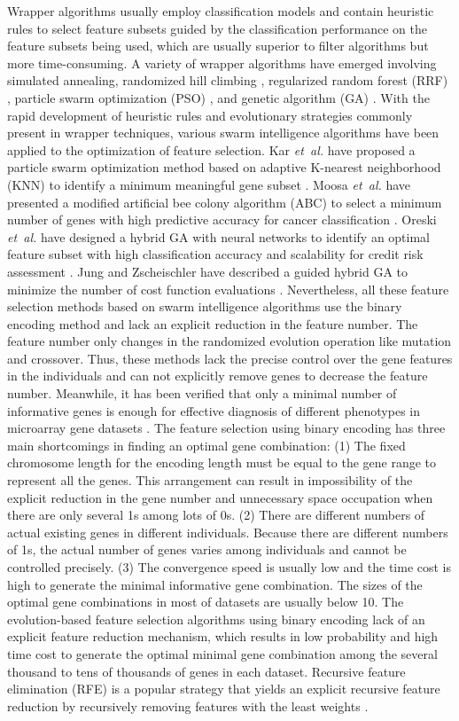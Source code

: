 \documentclass[10pt,journal,compsoc]{IEEEtran}
\begin{document}
	Wrapper algorithms usually employ classification models and contain heuristic rules to select feature subsets guided by the classification performance on the feature subsets being used, which are usually superior to filter algorithms but more time-consuming. A variety of wrapper algorithms have emerged involving simulated annealing, randomized hill climbing \cite{W26}, regularized random forest (RRF) \cite{W11}, particle swarm optimization (PSO) \cite{W12,W10}, and genetic algorithm (GA) \cite{W13}. With the rapid development of heuristic rules and evolutionary strategies commonly present in wrapper techniques, various swarm intelligence algorithms have been applied to the optimization of feature selection. Kar \emph{et~al.} have proposed a particle swarm optimization method based on adaptive K-nearest neighborhood (KNN) to identify a minimum meaningful gene subset \cite{W15}. Moosa \emph{et~al.} have presented a modified artificial bee colony algorithm (ABC) to select a minimum number of genes with high predictive accuracy for cancer classification \cite{P32}. Oreski \emph{et~al.} have designed a hybrid GA with neural networks to identify an optimal feature subset with high classification accuracy and scalability for credit risk assessment \cite{W17}. Jung and Zscheischler have described a guided hybrid GA to minimize the number of cost function evaluations \cite{W18}. Nevertheless, all these feature selection methods based on swarm intelligence algorithms use the binary encoding method and lack an explicit reduction in the feature number. The feature number only changes in the randomized evolution operation like mutation and crossover. Thus, these methods lack the precise control over the gene features in the individuals and can not explicitly remove genes to decrease the feature number. Meanwhile, it has been verified that only a minimal number of informative genes is enough for effective diagnosis of different phenotypes in microarray gene datasets \cite{P1,W16,P32,P33}. The feature selection using binary encoding has three main shortcomings in finding an optimal gene combination: (1) The fixed chromosome length for the encoding length must be equal to the gene range to represent all the genes. This arrangement can result in impossibility of the explicit reduction in the gene number and unnecessary space occupation when there are only several 1s among lots of 0s. (2) There are different numbers of actual existing genes in different individuals. Because there are different numbers of 1s, the actual number of genes varies among individuals and cannot be controlled precisely. (3) The convergence speed is usually low and the time cost is high to generate the minimal informative gene combination. 
	The sizes of the optimal gene combinations in most of datasets are usually below 10. The evolution-based feature selection algorithms using binary encoding lack of an explicit feature reduction mechanism, which results in low probability and high time cost to generate the optimal minimal gene combination among the several thousand to tens of thousands of genes in each dataset.
	Recursive feature elimination (RFE) is a popular strategy that yields an explicit recursive feature reduction by recursively removing features with the least weights \cite{W7,P1,P2,P27}.
	
\end{document}

